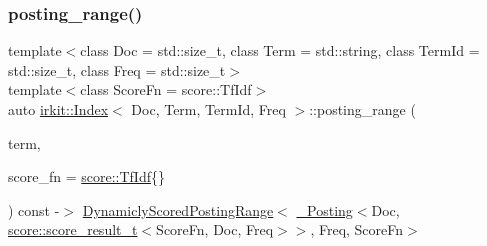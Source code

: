 \mbox{\label{classirkit_1_1Index_a931de856b06aac7957f7182048e8e852}} 
\subsubsection{\texorpdfstring{posting\+\_\+range()}{posting\_range()}\hspace{0.1cm}{\footnotesize\ttfamily [1/2]}}
{\footnotesize\ttfamily template$<$class Doc  = std\+::size\+\_\+t, class Term  = std\+::string, class Term\+Id  = std\+::size\+\_\+t, class Freq  = std\+::size\+\_\+t$>$ \\
template$<$class Score\+Fn  = score\+::\+Tf\+Idf$>$ \\
auto \hyperlink{classirkit_1_1Index}{irkit\+::\+Index}$<$ Doc, Term, Term\+Id, Freq $>$\+::posting\+\_\+range (\begin{DoxyParamCaption}\item[{const std\+::string \&}]{term,  }\item[{Score\+Fn}]{score\+\_\+fn = {\ttfamily \hyperlink{structirkit_1_1score_1_1TfIdf}{score\+::\+Tf\+Idf}\{\}} }\end{DoxyParamCaption}) const -\/$>$ \hyperlink{classirkit_1_1DynamiclyScoredPostingRange}{Dynamicly\+Scored\+Posting\+Range}$<$
            \hyperlink{structirkit_1_1__Posting}{\+\_\+\+Posting}$<$Doc, \hyperlink{namespaceirkit_1_1score_ab6226695d6d5c54c84fcf2cb8e90c8b3}{score\+::score\+\_\+result\+\_\+t}$<$Score\+Fn, Doc, Freq$>$$>$,
            Freq,
            Score\+Fn$>$
    \hspace{0.3cm}{\ttfamily [inline]}}

\mbox{\label{classirkit_1_1Index_abeb1c1b2ddc660e42c5c6dad0bab4dc4}} 

